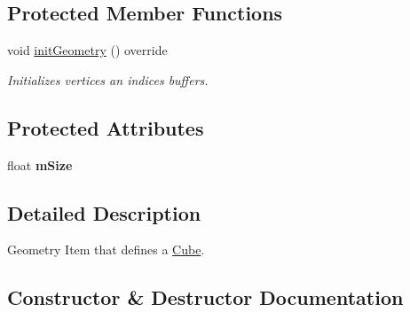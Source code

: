 \subsection*{Protected Member Functions}
\begin{DoxyCompactItemize}
\item 
\mbox{\label{class_geometry_engine_1_1_geometry_world_item_1_1_geometry_item_1_1_cube_acdfe53700969b8060b6649f4cea14b41}} 
void \mbox{\hyperlink{class_geometry_engine_1_1_geometry_world_item_1_1_geometry_item_1_1_cube_acdfe53700969b8060b6649f4cea14b41}{init\+Geometry}} () override
\begin{DoxyCompactList}\small\item\em Initializes vertices an indices buffers. \end{DoxyCompactList}\end{DoxyCompactItemize}
\subsection*{Protected Attributes}
\begin{DoxyCompactItemize}
\item 
\mbox{\label{class_geometry_engine_1_1_geometry_world_item_1_1_geometry_item_1_1_cube_ab8f55c65010441e00d9b7268285095d4}} 
float {\bfseries m\+Size}
\end{DoxyCompactItemize}


\subsection{Detailed Description}
Geometry Item that defines a \mbox{\hyperlink{class_geometry_engine_1_1_geometry_world_item_1_1_geometry_item_1_1_cube}{Cube}}. 

\subsection{Constructor \& Destructor Documentation}
\mbox{\label{class_geometry_engine_1_1_geometry_world_item_1_1_geometry_item_1_1_cube_a3971e98ccf681ba9dfae15b33ae0ca22}} 
